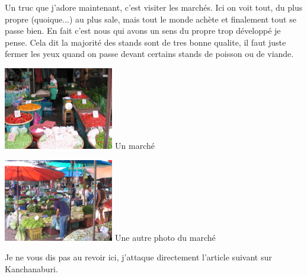 \begin{multicols}{2}
Un truc que j'adore maintenant, c'est visiter les marchés. Ici on voit tout, du plus propre (quoique...) au plus sale, mais tout le monde achète et finalement tout se passe bien. En fait c'est nous qui avons un sens du propre trop développé je pense. Cela dit la majorité des stands sont de tres bonne qualite, il faut juste fermer les yeux quand on passe devant certains stands de poisson ou de viande.

\hspace*{-0.65cm}
\includegraphics[width=4.8cm]{articles/Bangkok/1384.jpg}
Un marché

\hspace*{-0.65cm}
\includegraphics[width=4.8cm]{articles/Bangkok/1387.jpg}
Une autre photo du marché


Je ne vous dis pas au revoir ici, j'attaque directement l'article suivant sur Kanchanaburi.

\end{multicols}



